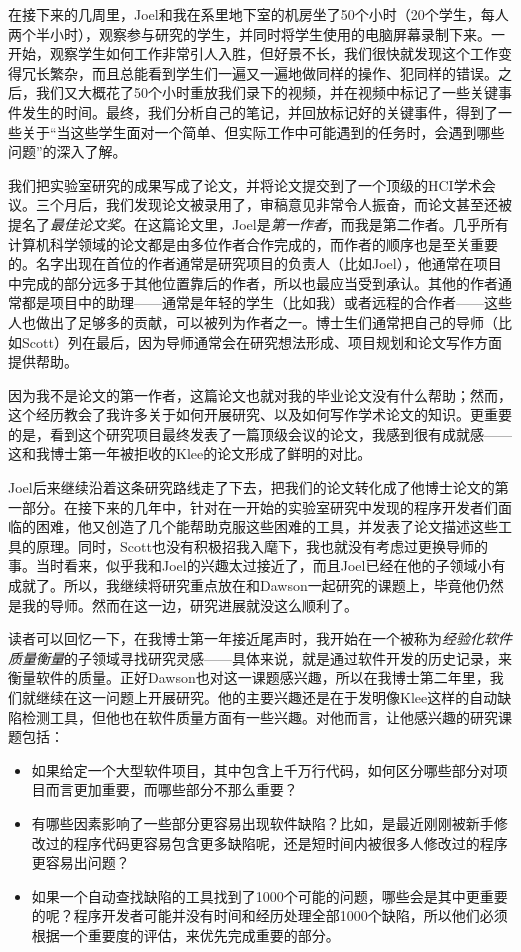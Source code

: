\documentclass[letter,12pt]{book}
\begin{document}
\begin{CJK}{UTF8}{gbsn}
在接下来的几周里，Joel和我在系里地下室的机房坐了50个小时（20个学生，每人两个半小时），观察参与研究的学生，并同时将学生使用的电脑屏幕录制下来。一开始，观察学生如何工作非常引人入胜，但好景不长，我们很快就发现这个工作变得冗长繁杂，而且总能看到学生们一遍又一遍地做同样的操作、犯同样的错误。之后，我们又大概花了50个小时重放我们录下的视频，并在视频中标记了一些关键事件发生的时间。最终，我们分析自己的笔记，并回放标记好的关键事件，得到了一些关于“当这些学生面对一个简单、但实际工作中可能遇到的任务时，会遇到哪些问题”的深入了解。

我们把实验室研究的成果写成了论文，并将论文提交到了一个顶级的HCI学术会议。三个月后，我们发现论文被录用了，审稿意见非常令人振奋，而论文甚至还被提名了\emph{最佳论文奖}。在这篇论文里，Joel是\emph{第一作者}，而我是第二作者。几乎所有计算机科学领域的论文都是由多位作者合作完成的，而作者的顺序也是至关重要的。名字出现在首位的作者通常是研究项目的负责人（比如Joel），他通常在项目中完成的部分远多于其他位置靠后的作者，所以也最应当受到承认。其他的作者通常都是项目中的助理——通常是年轻的学生（比如我）或者远程的合作者——这些人也做出了足够多的贡献，可以被列为作者之一。博士生们通常把自己的导师（比如Scott）列在最后，因为导师通常会在研究想法形成、项目规划和论文写作方面提供帮助。

因为我不是论文的第一作者，这篇论文也就对我的毕业论文没有什么帮助；然而，这个经历教会了我许多关于如何开展研究、以及如何写作学术论文的知识。更重要的是，看到这个研究项目最终发表了一篇顶级会议的论文，我感到很有成就感——这和我博士第一年被拒收的Klee的论文形成了鲜明的对比。

Joel后来继续沿着这条研究路线走了下去，把我们的论文转化成了他博士论文的第一部分。在接下来的几年中，针对在一开始的实验室研究中发现的程序开发者们面临的困难，他又创造了几个能帮助克服这些困难的工具，并发表了论文描述这些工具的原理。同时，Scott也没有积极招我入麾下，我也就没有考虑过更换导师的事。当时看来，似乎我和Joel的兴趣太过接近了，而且Joel已经在他的子领域小有成就了。所以，我继续将研究重点放在和Dawson一起研究的课题上，毕竟他仍然是我的导师。然而在这一边，研究进展就没这么顺利了。

\breakline

读者可以回忆一下，在我博士第一年接近尾声时，我开始在一个被称为\emph{经验化软件质量衡量}的子领域寻找研究灵感——具体来说，就是通过软件开发的历史记录，来衡量软件的质量。正好Dawson也对这一课题感兴趣，所以在我博士第二年里，我们就继续在这一问题上开展研究。他的主要兴趣还是在于发明像Klee这样的自动缺陷检测工具，但他也在软件质量方面有一些兴趣。对他而言，让他感兴趣的研究课题包括：

\begin{itemize}
\item 如果给定一个大型软件项目，其中包含上千万行代码，如何区分哪些部分对项目而言更加重要，而哪些部分不那么重要？
\item 有哪些因素影响了一些部分更容易出现软件缺陷？比如，是最近刚刚被新手修改过的程序代码更容易包含更多缺陷呢，还是短时间内被很多人修改过的程序更容易出问题？
\item 如果一个自动查找缺陷的工具找到了1000个可能的问题，哪些会是其中更重要的呢？程序开发者可能并没有时间和经历处理全部1000个缺陷，所以他们必须根据一个重要度的评估，来优先完成重要的部分。
\end{itemize}


\end{CJK}
\end{document}
